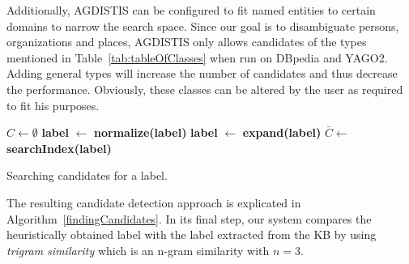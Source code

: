  
Additionally, AGDISTIS can be configured to fit named entities to certain domains to narrow the search space.
Since our goal is to disambiguate persons, organizations and places, AGDISTIS only allows candidates of the types mentioned in Table~\ref{tab:tableOfClasses} when run on DBpedia and YAGO2.
Adding general types will increase the number of candidates and thus decrease the performance.
Obviously, these classes can be altered by the user as required to fit his purposes. 


\begin{algorithm}[htb!]
$C \longleftarrow \emptyset$\;
{\bf label } $\longleftarrow$ {\bf normalize(label)}\;
{\bf label } $\longleftarrow$ {\bf expand(label)}\;
$ \displaystyle \bar C \longleftarrow$ {\bf searchIndex(label)}\;
\For{{\bf c} $\in \bar C$}{
    \If{$\neg${\bf c .matches([0-9]$^+$)}}{
        \If{{\bf trigramSimilarity(c, label)}$ \geq \sigma$}{
            \If{{\bf fitDomain(c)}} {
                $C \longleftarrow C \cup $ {\bf c}\;
            }
        }
    }
}
\caption{Searching candidates for a label.}
\label{findingCandidates}
\end{algorithm}



The resulting candidate detection approach is explicated in Algorithm~\ref{findingCandidates}.
In its final step, our system compares the heuristically obtained label with the label extracted from the \ac{KB} by using \emph{trigram similarity} which is an n-gram similarity with $n=3$. 

